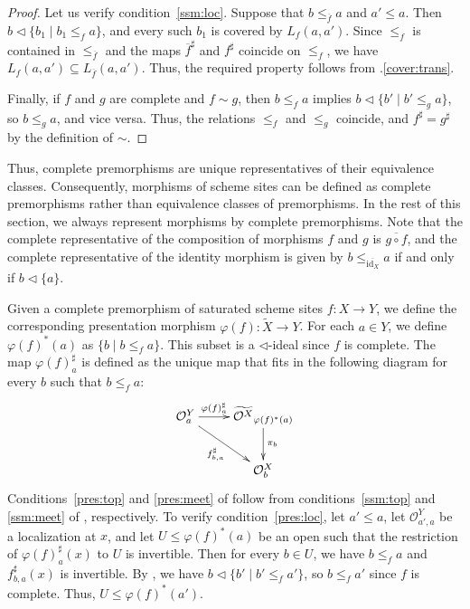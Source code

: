 \documentclass[reqno]{amsart}
\theoremstyle{definition}
\theoremstyle{remark}
\numberwithin{figure}{section}
\newcommand{\cover}{\triangleleft}
\begin{document}
\begin{proof}
Let us verify condition~\eqref{ssm:loc}.
Suppose that $b \leq_{\overline{f}} a$ and $a' \leq a$.
Then $b \cover \{ b_1 \mid b_1 \leq_f a \}$, and every such $b_1$ is covered by $L_f(a,a')$.
Since $\leq_f$ is contained in $\leq_{\overline{f}}$ and the maps $\overline{f}^\sharp$ and $f^\sharp$ coincide on $\leq_f$,
we have $L_f(a,a') \subseteq L_{\overline{f}}(a,a')$.
Thus, the required property follows from .\eqref{cover:trans}.

Finally, if $f$ and $g$ are complete and $f \sim g$, then $b \leq_f a$ implies $b \cover \{ b' \mid b' \leq_g a \}$, so $b \leq_g a$, and vice versa.
Thus, the relations $\leq_f$ and $\leq_g$ coincide, and $f^\sharp = g^\sharp$ by the definition of $\sim$.
\end{proof}

Thus, complete premorphisms are unique representatives of their equivalence classes.
Consequently, morphisms of scheme sites can be defined as complete premorphisms rather than equivalence classes of premorphisms.
In the rest of this section, we always represent morphisms by complete premorphisms.
Note that the complete representative of the composition of morphisms $f$ and $g$ is $\overline{g \circ f}$,
and the complete representative of the identity morphism is given by $b \leq_{\overline{\mathrm{id}_X}} a$ if and only if $b \cover \{ a \}$.

Given a complete premorphism of saturated scheme sites $f : X \to Y$, we define the corresponding presentation morphism $\varphi(f) : \widetilde{X} \to Y$.
For each $a \in Y$, we define $\varphi(f)^*(a)$ as $\{ b \mid b \leq_f a \}$.
This subset is a $\cover$-ideal since $f$ is complete.
The map $\varphi(f)^\sharp_a$ is defined as the unique map that fits in the following diagram for every $b$ such that $b \leq_f a$:
\[ \xymatrix{ \mathcal{O}^Y_a \ar[r]^-{\varphi(f)^\sharp_a} \ar[dr]_{f^\sharp_{b,a}} & \widetilde{\mathcal{O}^X}_{\varphi(f)^*(a)} \ar[d]^{\pi_b} \\
                                                                                     & \mathcal{O}^X_b
            } \]
Conditions~\eqref{pres:top} and \eqref{pres:meet} of  follow
from conditions~\eqref{ssm:top} and \eqref{ssm:meet} of , respectively.
To verify condition~\eqref{pres:loc}, let $a' \leq a$, let $\mathcal{O}^Y_{a',a}$ be a localization at $x$, and let $U \leq \varphi(f)^*(a)$ be an open such that the restriction of $\varphi(f)^\sharp_a(x)$ to $U$ is invertible.
Then for every $b \in U$, we have $b \leq_f a$ and $f^\sharp_{b,a}(x)$ is invertible.
By , we have $b \cover \{ b' \mid b' \leq_f a' \}$, so $b \leq_f a'$ since $f$ is complete.
Thus, $U \leq \varphi(f)^*(a')$.
\end{document}
